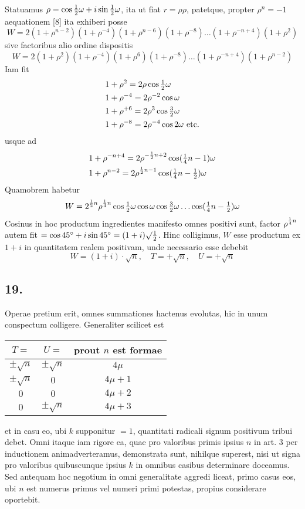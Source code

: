 \documentclass[twoside,12pt, showframe]{memoir}
\let\oldfrac\frac
\def\frac#1#2{\mathchoice{\tfrac{#1}{#2}}{\oldfrac{#1}{#2}}{\genfrac{}{}{}{2}{#1}{#2\mathstrut}}{\genfrac{}{}{}{3}{#1}{#2\mathstrut}}}
\begin{document}
Statuamus \(\rho=\cos \frac{1}{2} \omega+i \sin \frac{1}{2} \omega\), ita ut fiat \(r=\rho \rho\), patetque, propter \(\rho^{n}=-1\) aequationem [8] ita exhiberi posse
\[W=2(1+\rho^{n-2})(1+\rho^{-4})(1+\rho^{n-6})(1+\rho^{-8}) \ldots(1+\rho^{-n+4})(1+\rho^{2})\]
sive factoribus alio ordine dispositis
\[W=2(1+\rho^{2})(1+\rho^{-4})(1+\rho^{6})(1+\rho^{-8}) \ldots(1+\rho^{-n+4})(1+\rho^{n-2})\]
Iam fit
\[\begin{aligned}
& 1+\rho^{2}=2 \rho \cos \frac{1}{2} \omega \\
& 1+\rho^{-4}=2 \rho^{-2} \cos \omega \\
& 1+\rho^{+6}=2 \rho^{3} \cos \frac{3}{2} \omega \\
& 1+\rho^{-8}=2 \rho^{-4} \cos 2 \omega \text{ etc.}
\end{aligned}\]
usque ad
\[\begin{aligned}
& 1+\rho^{-n+4}=2 \rho^{-\frac{1}{2} n+2} \cos (\frac{1}{4} n-1) \omega \\
& 1+\rho^{n-2}=2 \rho^{\frac{1}{2} n-1} \cos (\frac{1}{4} n-\frac{1}{2}) \omega
\end{aligned}\]
Quamobrem habetur\clearpage\noindent%
\[W=2^{\frac{1}{2} n} \rho^{\frac{1}{4} n} \cos \frac{1}{2} \omega \cos \omega \cos \frac{3}{2} \omega \ldots \cos (\frac{1}{4} n-\frac{1}{2}) \omega\]
Cosinus in hoc productum ingredientes manifesto omnes positivi sunt, factor \(\rho^{\frac{1}{4}n}\) autem fit \(=\cos 45^{\circ}+i \sin 45^{\circ}=(1+i) \surd \frac{1}{2}\). Hinc colligimus, \(W\) esse productum ex \(1+i\) in quantitatem realem positivam, unde necessario esse debebit
\[W=(1+i) \cdot \surd n, \quad T=+\surd n, \quad U=+\surd n\]

\subsection*{19.}
 
Operae pretium erit, omnes summationes hactenus evolutas, hic in unum conspectum colligere. Generaliter scilicet est
\begin{center}
\begin{tabular}{|c|c|c|}
\hline
\(T=\) & \(U=\) & prout \(n\) est formae \\
\hline
\(\pm \surd n\) & \(\pm \surd n\) & \(4 \mu\) \\
\(\pm \surd n\) & \(0\) & \(4 \mu+1\) \\
\(0\) & \(0\) & \(4 \mu+2\) \\
\(0\) & \(\pm \surd n\) & \(4 \mu+3\) \\
\hline
\end{tabular}
\end{center}
et in casu eo, ubi \(k\) supponitur \(=1\), quantitati radicali signum positivum tribui debet. Omni itaque iam rigore ea, quae pro valoribus primis ipsius \(n\) in art. 3 per inductionem animadverteramus, demonstrata sunt, nihilque superest, nisi ut signa pro valoribus quibuscunque ipsius \(k\) in omnibus casibus determinare doceamus. Sed antequam hoc negotium in omni generalitate aggredi liceat, primo casus eos, ubi \(n\) est numerus primus vel numeri primi potestas, propius considerare oportebit.
\end{document}
